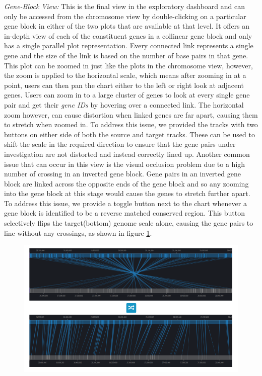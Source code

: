 \textit{Gene-Block View:} This is the final view in the exploratory dashboard and can only be accessed from the chromosome view by double-clicking on a particular gene block in either of the two plots that are available at that level. It offers an in-depth view of each of the constituent genes in a collinear gene block and only has a single parallel plot representation. Every connected link represents a single gene and the size of the link is based on the number of base pairs in that gene. This plot can be zoomed in just like the plots in the chromosome view, however, the zoom is applied to the horizontal scale, which means after zooming in at a point, users can then pan the chart either to the left or right look at adjacent genes. Users can zoom in to a large cluster of genes to look at every single gene pair and get their \textit{gene IDs} by hovering over a connected link. The horizontal zoom however, can cause distortion when linked genes are far apart, causing them to stretch when zoomed in. To address this issue, we provided the tracks with two buttons on either side of both the source and target tracks. These can be used to shift the scale in the required direction to ensure that the gene pairs under investigation are not distorted and instead correctly lined up. Another common issue that can occur in this view is the visual occlusion problem due to a high number of crossing in an inverted gene block. Gene pairs in an inverted gene block are linked across the opposite ends of the gene block and so any zooming into the gene block at this stage would cause the genes to stretch further apart. To address this issue, we provide a toggle button next to the chart whenever a gene block is identified to be a reverse matched conserved region. This button selectively flips the target(bottom) genome scale alone, causing the gene pairs to line without any crossings, as shown in figure \ref{fig:ch_5_block_view_invert}. 

\begin{figure}
  \centering
  \includegraphics[width=1\linewidth]{images/ch_5_block_view_invert.PNG}
  \label{fig:ch_5_block_view_invert}
\end{figure} 


